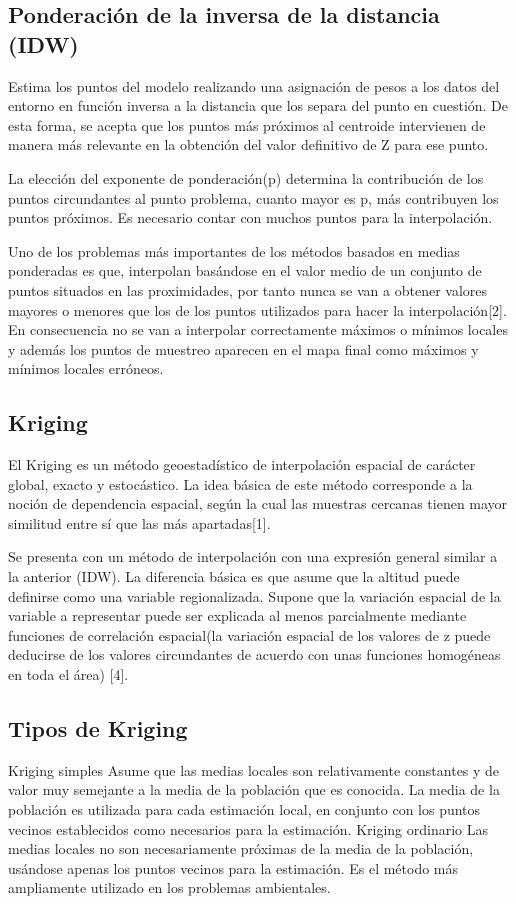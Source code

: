\subsection{Ponderación de la inversa de la distancia (IDW)}
Estima los puntos del modelo realizando una asignación de pesos a los datos
del entorno en función inversa a la distancia que los separa del punto en
cuestión. De esta forma, se acepta  que  los puntos más próximos al centroide
intervienen de manera más relevante en la obtención del valor definitivo
de Z para ese punto.

La elección del exponente de ponderación(p) determina la contribución de
los puntos circundantes al punto problema, cuanto mayor es p, más contribuyen
los puntos próximos. Es necesario contar con muchos puntos para la interpolación.

Uno de los problemas más importantes de los métodos basados en medias
ponderadas es que, interpolan basándose en el valor medio de un conjunto
de puntos situados en las proximidades, por tanto nunca se van a obtener
valores mayores o menores que los de los puntos utilizados para hacer la
interpolación[2]. En consecuencia no se van a interpolar correctamente
máximos o mínimos locales y además los puntos de muestreo aparecen en el
mapa final como máximos y mínimos locales erróneos.

\subsection{Kriging}
El Kriging es un método geoestadístico de interpolación espacial de carácter
global, exacto y estocástico. La idea básica de este método corresponde a
la noción de dependencia espacial, según la cual las muestras cercanas
tienen mayor similitud entre sí que las más apartadas[1].

Se presenta con un método de interpolación con una expresión general
similar a la anterior (IDW). La diferencia básica es que asume que la
altitud puede definirse como una variable regionalizada. Supone que la
variación espacial de la variable a representar puede ser explicada al
menos parcialmente mediante funciones de correlación espacial(la variación
espacial de los valores de z puede deducirse de los valores circundantes
de acuerdo con unas funciones homogéneas en toda el área) [4].

\subsection{Tipos de Kriging}
Kriging simples
Asume que las medias locales son relativamente constantes y de valor muy
semejante a la media de la población que es conocida. La media de la
población es utilizada para cada estimación local, en conjunto con los
puntos vecinos establecidos como necesarios para la estimación.
Kriging ordinario
Las medias locales no son necesariamente próximas de la media de la población,
usándose apenas los puntos vecinos para la estimación. Es el método más
ampliamente utilizado en los problemas ambientales.

